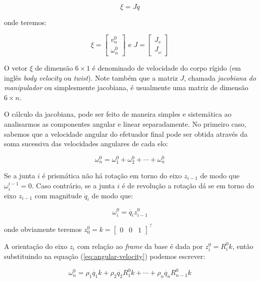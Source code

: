 \begin{equation}
    \xi = J \dot{q}
\end{equation}

onde teremos:

\begin{equation}
    \xi = \begin{bmatrix}
        v_n^0 \\
        \omega_n^0
    \end{bmatrix} \text{ e } J = \begin{bmatrix}
        J_v \\
        J_\omega
    \end{bmatrix}
\end{equation}

O vetor \(\xi\) de dimensão \(6 \times 1\) é denominado de velocidade do corpo
rígido (em inglês \emph{body velocity} ou \emph{twist}). Note também que a
matriz \(J\), chamada \emph{jacobiana do manipulador} ou simplesmente
jacobiana, é usualmente uma matriz de dimensão \(6 \times n\).

O cálculo da jacobiana, pode ser feito de maneira simples e sistemática ao
analisarmos as componentes angular e linear separadamente. No primeiro caso,
sabemos que a velocidade angular do efetuador final pode ser obtida através da
soma sucessiva das velocidades angulares de cada elo:

\begin{equation}\label{eq:angular-velocity}
    \omega_n^0 = \omega_{1}^0 + \omega_{2}^0 + \cdots + \omega_n^{0}
\end{equation}

Se a junta \(i\) é prismática não há rotação em torno do eixo \(z_{i-1}\) de
modo que \(\omega_i^{i-1} = 0\). Caso contrário, se a junta \(i\) é de
revolução a rotação dá se em torno do eixo $z_{i-1}$ com magnitude $\dot{q}_i$
de modo que:

\begin{equation}
    \omega_i^{0} = \dot{q_i} z_{i-1}^{0}
\end{equation}

onde obviamente teremos \(z_{0}^{0} = k = \begin{bmatrix}
    0 & 0 & 1
\end{bmatrix}^\top\)

A orientação do eixo \(z_{i}\) com relação ao \emph{frame} da base é dada por
\(z_{i}^0 = R_{i}^0 k\), então substituindo na equação
(\ref{eq:angular-velocity}) podemos escrever:

\begin{equation}
    \omega_n^0 = \rho_1 \dot{q_1} k + \rho_2 \dot{q_2} R_1^0 k + \cdots + \rho_n \dot{q_n} R_{n-1}^0 k
\end{equation}

